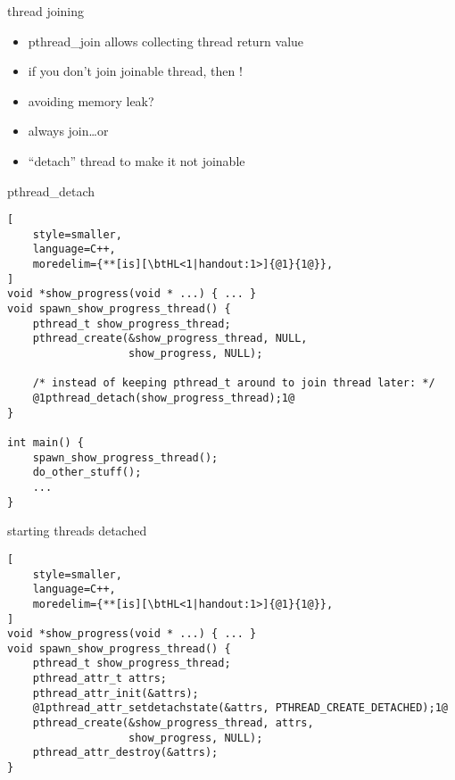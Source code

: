 \begin{frame}{thread joining}
\begin{itemize}
    \item pthread\_join allows collecting thread return value
    \item if you don't join joinable thread, then !
    \vspace{.5cm}
    \item<2-> avoiding memory leak?
    \item<2-> always join\ldots or
    \item<2-> ``detach'' thread to make it not joinable
\end{itemize}
\end{frame}

\begin{frame}[fragile,label=pthreadDetach]{pthread\_detach}
\begin{lstlisting}[
    style=smaller,
    language=C++,
    moredelim={**[is][\btHL<1|handout:1>]{@1}{1@}},
]
void *show_progress(void * ...) { ... }
void spawn_show_progress_thread() {
    pthread_t show_progress_thread;
    pthread_create(&show_progress_thread, NULL,
                   show_progress, NULL);

    /* instead of keeping pthread_t around to join thread later: */
    @1pthread_detach(show_progress_thread);1@
}

int main() {
    spawn_show_progress_thread();
    do_other_stuff();
    ...
}
\end{lstlisting}
\end{frame}

\begin{frame}[fragile,label=startThreadDetached]{starting threads detached}
\begin{lstlisting}[
    style=smaller,
    language=C++,
    moredelim={**[is][\btHL<1|handout:1>]{@1}{1@}},
]
void *show_progress(void * ...) { ... }
void spawn_show_progress_thread() {
    pthread_t show_progress_thread;
    pthread_attr_t attrs;
    pthread_attr_init(&attrs);
    @1pthread_attr_setdetachstate(&attrs, PTHREAD_CREATE_DETACHED);1@
    pthread_create(&show_progress_thread, attrs,
                   show_progress, NULL);
    pthread_attr_destroy(&attrs);
}
\end{lstlisting}
\end{frame}

